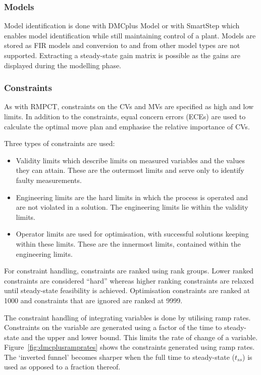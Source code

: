 \subsubsection{Models}
Model identification is done with DMCplus Model or with SmartStep which enables model identification while still maintaining control of a plant.
Models are stored as FIR models and conversion to and from other model types are not supported.
Extracting a steady-state gain matrix is possible as the gains are displayed during the modelling phase.

\subsubsection{Constraints}\label{sec:dmcpluscons}
As with RMPCT, constraints on the CVs and MVs are specified as high and low limits.
In addition to the constraints, equal concern errors (ECEs) are used to calculate the optimal move plan and emphasise the relative importance of CVs.

Three types of constraints are used:
\begin{itemize}
\item Validity limits which describe limits on measured variables and the values they can attain.
These are the outermost limits and serve only to identify faulty measurements.
\item Engineering limits are the hard limits in which the process is operated and are not violated in a solution.
The engineering limits lie within the validity limits.
\item Operator limits are used for optimisation, with successful solutions keeping within these limits.
These are the innermost limits, contained within the engineering limits.
\end{itemize}

For constraint handling, constraints are ranked using rank groups.
Lower ranked constraints are considered ``hard'' whereas higher ranking constraints are relaxed until steady-state feasibility is achieved.
Optimisation constraints are ranked at 1000 and constraints that are ignored are ranked at 9999.

The constraint handling of integrating variables is done by utilising ramp rates.
Constraints on the variable are generated using a factor of the time to steady-state and the upper and lower bound.
This limits the rate of change of a variable.
Figure~\ref{fig:dmcplusramprates} shows the constraints generated using ramp rates.
The `inverted funnel' becomes sharper when the full time to steady-state ($t_{ss}$) is used as opposed to a fraction thereof.

